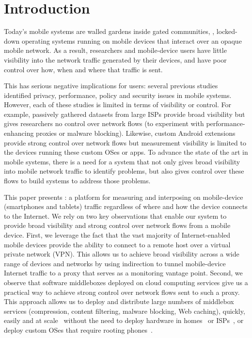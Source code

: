 \section{Introduction}
\label{sec:introduction}

Today's mobile systems are walled gardens inside gated communities, \ie{}, locked-down operating systems 
running on mobile devices that interact over an opaque mobile network. As a result, 
researchers and mobile-device users have little visibility into the network traffic generated by 
their devices, and have poor control over how, when and where that traffic is sent. 

This has serious negative implications for users: several previous studies~\cite{vallina-rod:ads,gerber:passivespeed,chen:wifi,enck:taintdroid,wang:middleboxes,sommers:cellwifi} 
identified privacy, performance, policy and security issues in mobile systems. However, each of these studies 
is limited in terms of visibility or control. For example, passively gathered datasets from large 
ISPs provide broad visibility but gives researchers no control over network flows (\eg to experiment with 
performance-enhancing proxies or malware blocking). Likewise, custom Android extensions provide 
strong control over network flows but measurement visibility is limited to the devices running these custom OSes or apps. 
To advance the state of the art in mobile systems, there is a need for a system that not only gives 
broad visibility into mobile network traffic to identify problems, but also gives control over these flows 
to build systems to address those problems. 

This paper presents \meddle:  a platform for measuring and interposing on mobile-device (\eg smartphones and tablets) 
traffic regardless of where and how the device connects to the Internet. We rely on two key observations 
that enable our system to provide broad visibility and strong control over network flows from a mobile device. 
First, we 
 leverage the fact that 
the vast majority of Internet-enabled mobile devices provide the ability to connect to a remote host over a virtual private 
network (VPN). This allows us to achieve broad visibility across a wide range of devices and networks by using indirection 
to tunnel mobile-device Internet traffic to a proxy that serves as a monitoring vantage point.
Second, we observe that  
software middleboxes deployed on cloud computing services give us a practical way to achieve strong control over 
network flows sent to such a proxy. This approach allows us to deploy and distribute large numbers 
of middlebox services (\eg compression, content filtering, malware blocking, Web caching), quickly, easily and at scale~\cite{sherry:middleboxes} without 
the need to deploy hardware in homes~\cite{bismark} or ISPs~\cite{wang:middleboxes}, or 
deploy custom OSes that require rooting phones~\cite{enck:taintdroid}. 

